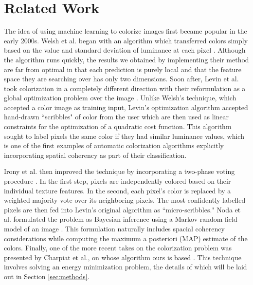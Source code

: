 \section{Related Work}
\label{sec:related}

The idea of using machine learning to colorize images first became popular in the early 2000s.  Welsh et al. began with an algorithm which transferred colors simply based on the value and standard deviation of luminance at each pixel \cite{welsh2002transferring}.  Although the algorithm runs quickly, the results we obtained by implementing their method are far from optimal in that each prediction is purely local and that the feature space they are searching over has only two dimensions.  Soon after, Levin et al. took colorization in a completely different direction with their reformulation as a global optimization problem over the image \cite{levin2004colorization}.  Unlike Welsh's technique, which accepted a color image as training input, Levin's optimization algorithm accepted hand-drawn ``scribbles" of color from the user which are then used as linear constraints for the optimization of a quadratic cost function.  This algorithm sought to label pixels the same color if they had similar luminance values, which is one of the first examples of automatic colorization algorithms explicitly incorporating spatial coherency as part of their classification.

Irony et al. then improved the technique by incorporating a two-phase voting procedure \cite{irony2005colorization}.  In the first step, pixels are independently colored based on their individual texture features.  In the second, each pixel's color is replaced by a weighted majority vote over its neighboring pixels.  The most confidently labelled pixels are then fed into Levin's original algorithm as ``micro-scribbles."  Noda et al. formulated the problem as Bayesian inference using a Markov random field model of an image \cite{noda2005bayesian}.  This formulation naturally includes spacial coherency considerations while computing the maximum a posteriori (MAP) estimate of the colors.  Finally, one of the more recent takes on the colorization problem was presented by Charpiat et al., on whose algorithm ours is based \cite{charpiat2010machine}.  This technique involves solving an energy minimization problem, the details of which will be laid out in Section \ref{sec:methods}.